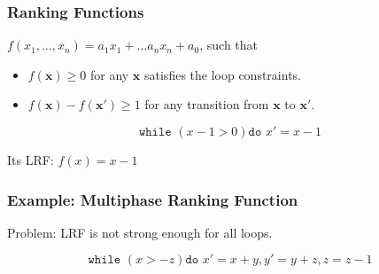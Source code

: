 \documentclass[11pt]{beamer}
\begin{document}
\begin{frame}\frametitle{Ranking Functions}

\begin{definition}

$f(x_1, \ldots, x_n) = a_1x_1 + \ldots a_nx_n + a_0$, such that

\begin{itemize}
\item $f(\textbf{x}) \ge 0$ for any $\textbf{x}$ satisfies the loop constraints.

\item $f(\textbf{x}) - f(\textbf{x}') \ge 1$ for any transition from $\textbf{x}$ to $\textbf{x}'$.



\end{itemize}
\end{definition}

\begin{example}
\[\texttt{while }( x - 1 > 0) \texttt{do } x' = x - 1\]

Its LRF: $f(x) = x - 1$
\end{example}

\end{frame}


\begin{frame}\frametitle{Example: Multiphase Ranking Function}
Problem: LRF is not strong enough for all loops.
\begin{example}
\[\texttt{while }( x > -z) \texttt{do } x' = x + y, y' = y + z, z = z - 1\]
\end{example}

\end{frame}
\end{document}
